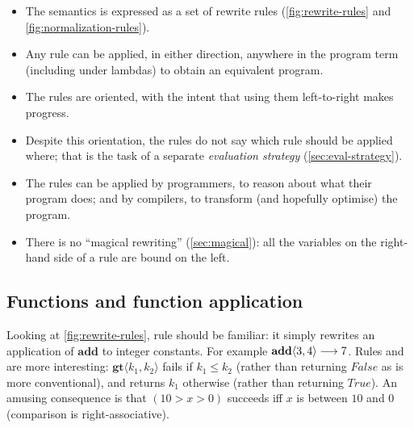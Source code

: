 \documentclass[acmsmall,review,anonymous,dvipsnames]{acmart}
\newcommand{\Conid}[1]{\mathit{#1}}
\newcommand{\Varid}[1]{\mathit{#1}}
\renewcommand{\leq}{\leqslant}
\begin{document}
\begin{itemize}
\item The semantics is expressed as a set of rewrite rules (\cref{fig:rewrite-rules} and \ref{fig:normalization-rules}).
\item Any rule can be applied, in either direction,
  anywhere in the program term (including under lambdas) to obtain an equivalent program.
\item The rules are oriented, with the intent that using them left-to-right makes progress.
\item Despite this orientation, the rules do not say which rule should be
  applied where; that is the task of a separate \emph{evaluation strategy} (\cref{sec:eval-strategy}).
\item The rules can be applied by programmers, to reason about what their program does;
  and by compilers, to transform (and hopefully optimise) the program.
\item There is no ``magical rewriting'' (\cref{sec:magical}): all the variables on the
  right-hand side of a rule are bound on the left.
\end{itemize}

\figureRewriteRules


\subsection{Functions and function application} \label{sec:beta}

Looking at \cref{fig:rewrite-rules}, rule 
should be familiar: it simply rewrites an application of \ensuremath{\textbf{add}} to integer
constants.  For example $\textbf{add}\langle\mathrm{3},\mathrm{4}\rangle \longrightarrow \mathrm{7}$.  Rules  and
 are more interesting: \ensuremath{\textbf{gt}\langle\Varid{k}_{\mathrm{1}},\Varid{k}_{\mathrm{2}}\rangle} fails if $k_1 \leq k_2$ (rather than returning \ensuremath{\Conid{False}} as is more conventional), and returns \ensuremath{\Varid{k}_{\mathrm{1}}} otherwise (rather than returning \ensuremath{\Conid{True}}).
An amusing consequence is that \ensuremath{(\mathrm{10}\mathbin{>}\Varid{x}\mathbin{>}\mathrm{0})} succeeds
iff \ensuremath{\Varid{x}} is between \ensuremath{\mathrm{10}} and \ensuremath{\mathrm{0}} (comparison is right-associative).
\end{document}
